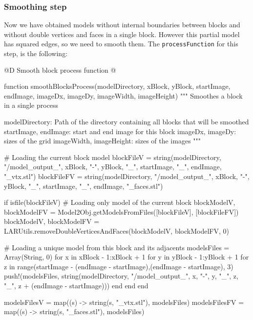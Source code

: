 \documentclass[11pt,oneside]{article}	%
\begin{document}
\subsubsection{Smoothing step}\label{sec:smoothingStep}

Now we have obtained models without internal boundaries between blocks and without double vertices and faces in a single block. However this partial model has squared edges, so we need to smooth them. The \texttt{processFunction} for this step, is the following:

@D Smooth block process function
@{function smoothBlocksProcess(modelDirectory,
                             xBlock, yBlock,
                             startImage, endImage,
                             imageDx, imageDy,
                             imageWidth, imageHeight)
  """
  Smoothes a block in a single process

  modelDirectory: Path of the directory containing all blocks
                  that will be smoothed
  startImage, endImage: start and end image for this block
  imageDx, imageDy: sizes of the grid
  imageWidth, imageHeight: sizes of the images
  """

  # Loading the current block model
  blockFileV = string(modelDirectory, "/model_output_", xBlock, "-", yBlock,
                      "_", startImage, "_", endImage, "_vtx.stl")
  blockFileFV = string(modelDirectory, "/model_output_", xBlock, "-", yBlock,
                       "_", startImage, "_", endImage, "_faces.stl")

  if isfile(blockFileV)
    # Loading only model of the current block
    blockModelV, blockModelFV = Model2Obj.getModelsFromFiles([blockFileV], [blockFileFV])
    blockModelV, blockModelFV = LARUtils.removeDoubleVerticesAndFaces(blockModelV,
                                                                      blockModelFV, 0)

    # Loading a unique model from this block and its adjacents
    modelsFiles = Array(String, 0)
    for x in xBlock - 1:xBlock + 1
      for y in yBlock - 1:yBlock + 1
        for z in range(startImage - (endImage - startImage),(endImage - startImage), 3)
          push!(modelsFiles, string(modelDirectory, "/model_output_",
                                    x, "-", y, "_", z, "_", z + (endImage - startImage)))
        end
      end
    end

    modelsFilesV = map((s) -> string(s, "_vtx.stl"), modelsFiles)
    modelsFilesFV = map((s) -> string(s, "_faces.stl"), modelsFiles)

}
\end{document}
